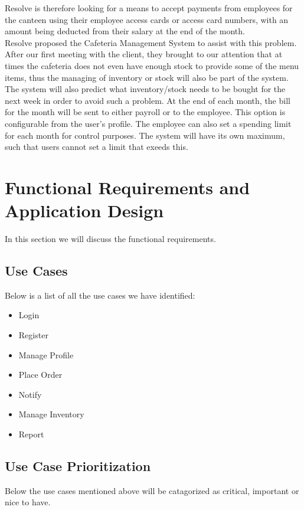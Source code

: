 \documentclass[a4paper,12pt]{article}
\begin{document}
Resolve is therefore looking for a means to accept payments from employees for the canteen using their employee access cards or access card numbers, with an amount being deducted from their salary at the end of the month.\\

Resolve proposed the Cafeteria Management System to assist with this problem.
After our first meeting with the client, they brought to our attention that at times the cafeteria does not even have enough stock to provide some of the menu items, thus the managing of inventory or stock will also be part of the system. The system will also predict what inventory/stock needs to be bought for the next week in order to avoid such a problem. At the end of each month, the bill for the month will be sent to either payroll or to the employee. This option is configurable from the user's profile. The employee can also set a spending limit for each month for control purposes. The system will have its own maximum, such that users cannot set a limit that exeeds this. 
 
\section{Functional Requirements and Application Design}
In this section we will discuss the functional requirements. \\

\subsection{Use Cases }
Below is a list of all the use cases we have identified:

\begin{itemize}

\item  Login
\item Register
\item Manage Profile
\item Place Order
\item Notify
\item Manage Inventory
\item Report

\end{itemize}


\subsection{Use Case Prioritization}
Below the use cases mentioned above will be catagorized as critical, important or nice to have.
\end{document}
